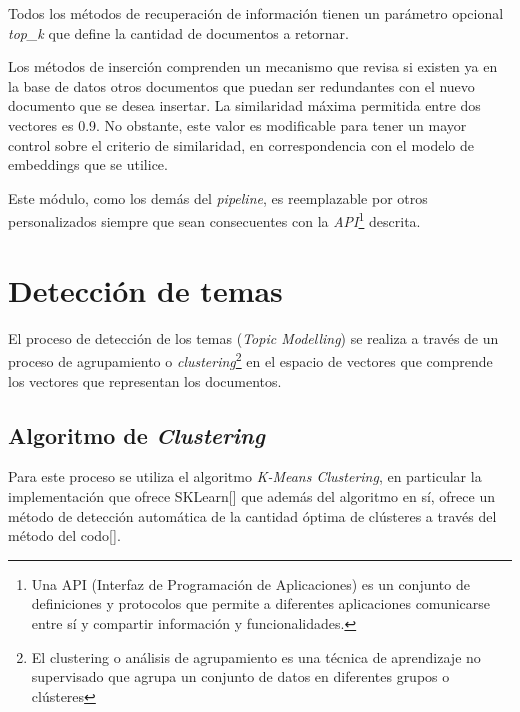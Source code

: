         Todos los métodos de recuperación de información tienen un parámetro opcional \emph{top\_k} que define la cantidad de documentos a retornar.

        Los métodos de inserción comprenden un mecanismo que revisa si existen ya en la base de datos otros documentos que puedan ser redundantes con el nuevo documento que se desea insertar. La similaridad máxima permitida entre dos vectores es 0.9. No obstante, este valor es modificable para tener un mayor control sobre el criterio de similaridad, en correspondencia con el modelo de embeddings que se utilice.

        Este módulo, como los demás del \emph{pipeline}, es reemplazable por otros personalizados siempre que sean consecuentes con la \emph{API}\footnote{Una API (Interfaz de Programación de Aplicaciones) es un conjunto de definiciones y protocolos que permite a diferentes aplicaciones comunicarse entre sí y compartir información y funcionalidades.} descrita.

\section{Detección de temas}
    El proceso de detección de los temas (\emph{Topic Modelling}) se realiza a través de un proceso de agrupamiento o \emph{clustering}\footnote{El clustering o análisis de agrupamiento es una técnica de aprendizaje no supervisado que agrupa un conjunto de datos en diferentes grupos o cl\'usteres} en el espacio de vectores que comprende los vectores que representan los documentos.

    \subsection{Algoritmo de \emph{Clustering}}
        Para este proceso se utiliza el algoritmo \emph{K-Means Clustering}, en particular la implementación que ofrece SKLearn[\cite{sklearn}] que además del algoritmo en sí, ofrece un método de detección automática de la cantidad óptima de cl\'usteres a través del método del codo[\cite{elbow}].
    
